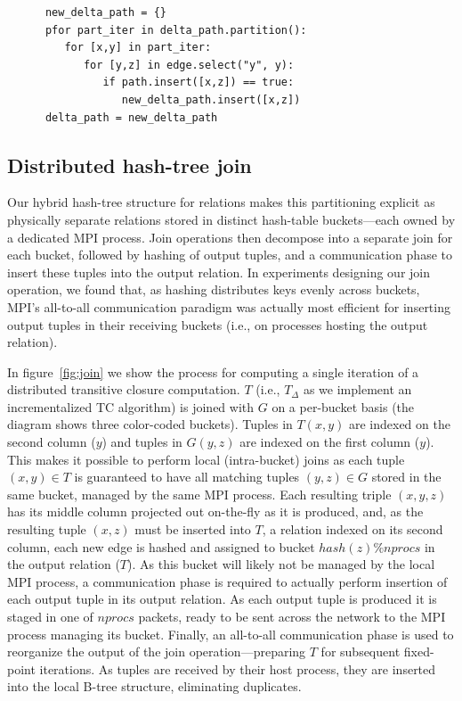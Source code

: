 \begin{verbatim}
      new_delta_path = {}
      pfor part_iter in delta_path.partition():
         for [x,y] in part_iter:
            for [y,z] in edge.select("y", y):
               if path.insert([x,z]) == true:
                  new_delta_path.insert([x,z])
      delta_path = new_delta_path   
\end{verbatim}


\subsection{Distributed hash-tree join}

Our hybrid hash-tree structure for relations makes this partitioning explicit as physically separate relations stored in distinct hash-table buckets---each owned by a dedicated MPI process. Join operations then decompose into a separate join for each bucket, followed by hashing of output tuples, and a communication phase to insert these tuples into the output relation. In experiments designing our join operation, we found that, as hashing distributes keys evenly across buckets, MPI's all-to-all communication paradigm was actually most efficient for inserting output tuples in their receiving buckets (i.e., on processes hosting the output relation).

In figure~\ref{fig:join} we show the process for computing a single iteration of a distributed transitive closure computation. $T$ (i.e., $T_\Delta$ as we implement an incrementalized TC algorithm) is joined with $G$ on a per-bucket basis (the diagram shows three color-coded buckets). Tuples in $T(x,y)$ are indexed on the second column ($y$) and tuples in $G(y,z)$ are indexed on the first column ($y$). This makes it possible to perform local (intra-bucket) joins as each tuple $(x,y) \in T$ is guaranteed to have all matching tuples $(y,z) \in G$ stored in the same bucket, managed by the same MPI process. Each resulting triple $(x,y,z)$ has its middle column projected out on-the-fly as it is produced, and, as the resulting tuple $(x,z)$ must be inserted into $T$, a relation indexed on its second column, each new edge is hashed and assigned to bucket $\mathit{hash}(z)\%\mathit{nprocs}$ in the output relation ($T$). As this bucket will likely not be managed by the local MPI process, a communication phase is required to actually perform insertion of each output tuple in its output relation. As each output tuple is produced it is staged in one of $\mathit{nprocs}$ packets, ready to be sent across the network to the MPI process managing its bucket. Finally, an all-to-all communication phase is used to reorganize the output of the join operation---preparing $T$ for subsequent fixed-point iterations. As tuples are received by their host process, they are inserted into the local B-tree structure, eliminating duplicates.  


